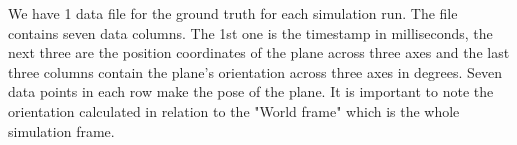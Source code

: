 We have 1 data file for the ground truth for each simulation run. The file contains seven data columns. The 1st one is the timestamp in milliseconds, the next three are the position coordinates of the plane across three axes and the last three columns contain the plane’s orientation across three axes in degrees. Seven data points in each row make the pose of the plane. It is important to note the orientation calculated in relation to the "World frame" which is the whole simulation frame. 



